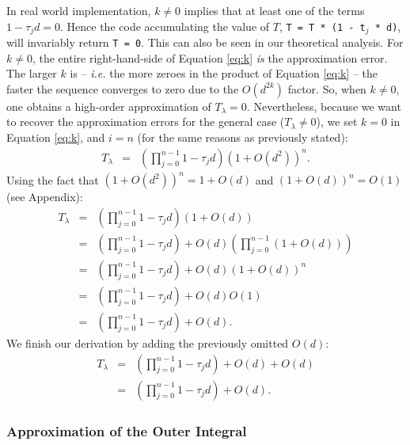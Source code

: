 In real world implementation, $k \neq 0$ implies that at least one of the terms $1 - \tau_j d = 0$. Hence the code accumulating the value of $T$,
\texttt{T = T * (1 - t$_j$ * d)},
will invariably return \texttt{T = 0}. This can also be seen in our theoretical analysis. For $k \neq 0$, the entire right-hand-side of Equation \eqref{eq:k} \emph{is} the approximation error. The larger $k$ is -- \emph{i.e.} the more zeroes in the product of Equation \eqref{eq:k} --  the faster the sequence converges to zero due to the $O(d^{2k})$ factor. So, when $k \neq 0$, one obtains a high-order approximation of $T_\lambda = 0$. Nevertheless, because we want to recover the approximation errors for the general case ($T_\lambda \neq 0$), we set $k = 0$ in Equation \eqref{eq:k}, and $i = n$ (for the same reasons as previously stated):
\begin{eqnarray}
T_\lambda
& = &\left( \prod_{j = 0}^{n-1} 1 - \tau_jd \right) (1 + O(d^2) )^{n}.
\end{eqnarray}
%
Using the fact that $(1 + O(d^2) )^{n} = 1 + O(d)$ and $(1 + O(d) )^{n} = O(1)$ (see Appendix):
\begin{eqnarray}
T_\lambda
& = &\left( \prod_{j = 0}^{n-1} 1 - \tau_jd \right) (1 + O(d))\\
& = &\left( \prod_{j = 0}^{n-1} 1 - \tau_jd \right)  +  O(d)\left( \prod_{j = 0}^{n-1} (1 + O(d)) \right) \\
& = &\left( \prod_{j = 0}^{n-1} 1 - \tau_jd \right)  +  O(d)(1 + O(d))^n \\
& = &\left( \prod_{j = 0}^{n-1} 1 - \tau_jd \right) + O(d)O(1) \\
& = &\left( \prod_{j = 0}^{n-1} 1 - \tau_jd \right) + O(d).
\end{eqnarray}
We finish our derivation by adding the previously omitted $O(d)$:
\begin{eqnarray}
T_\lambda
& = &\left( \prod_{j = 0}^{n-1} 1 - \tau_jd \right) + O(d) + O(d)\\
& = &\left( \prod_{j = 0}^{n-1} 1 - \tau_jd \right) + O(d).
\end{eqnarray}

\subsubsection{Approximation of the Outer Integral}

